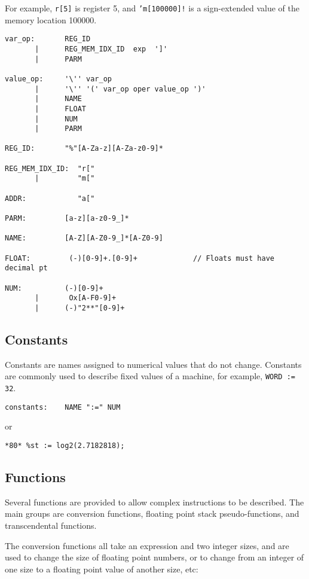 For example, \texttt{r[5]} is register 5, and \texttt{'m[100000]!}
is a sign-extended value of the memory location 100000.

{\small
\begin{verbatim}
var_op:       REG_ID
       |      REG_MEM_IDX_ID  exp  ']'
       |      PARM

value_op:     '\'' var_op
       |      '\'' '(' var_op oper value_op ')'
       |      NAME
       |      FLOAT
       |      NUM
       |      PARM

REG_ID:       "%"[A-Za-z][A-Za-z0-9]*

REG_MEM_IDX_ID:  "r[" 
       |         "m["

ADDR:            "a["

PARM:         [a-z][a-z0-9_]*

NAME:         [A-Z][A-Z0-9_]*[A-Z0-9]

FLOAT:         (-)[0-9]+.[0-9]+             // Floats must have decimal pt

NUM:          (-)[0-9]+
       |       Ox[A-F0-9]+  
       |      (-)"2**"[0-9]+ 
\end{verbatim}
}


\subsection{Constants}
Constants are names assigned to numerical values that do not change.
Constants are commonly used to describe fixed values of a 
machine, for example, \texttt{WORD := 32}.

{\small
\begin{verbatim}
constants:    NAME ":=" NUM
\end{verbatim}
}

or

{\small
\begin{verbatim}
*80* %st := log2(2.7182818);
\end{verbatim}
}


\subsection{Functions}
\label{sec-funcs}
Several functions are provided to allow complex instructions to be described.
The main groups are conversion functions, floating point stack pseudo-functions,
and transcendental functions.

The conversion functions all take an expression and two integer sizes, and
are used to change the size of floating point numbers, or to change from
an integer of one size to a floating point value of another size, etc:

